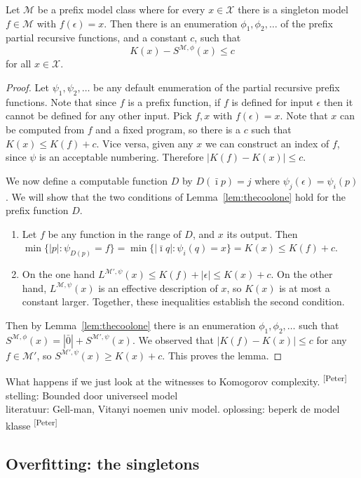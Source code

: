 \documentclass{style/llncs}
\newcommand{\M}{\mathscr M}
\newcommand{\X}{\mathscr X}
\newcommand{\pb}[1]{\textcolor{OliveGreen}{\small #1 \textsuperscript{[Peter]} }}
\begin{document}
\begin{lemma}
Let $\M$ be a prefix model class where for every $x\in\X$ there is a singleton model $f\in\M$ with $f(\epsilon)=x$. Then there is an enumeration $\phi_1,\phi_2,\ldots$ of the prefix partial recursive functions, and a constant $c$, such that
\[
K(x)-S^{\M,\phi}(x)\le c
\]
for all $x\in\X$.
\end{lemma}
\begin{proof}
Let $\psi_1,\psi_2,\ldots$ be any default enumeration of the partial recursive prefix functions. Note that since $f$ is a prefix function, if $f$ is defined for input $\epsilon$ then it cannot be defined for any other input. Pick $f,x$ with $f(\epsilon)=x$. Note that $x$ can be computed from $f$ and a fixed program, so there is a $c$ such that $K(x)\le K(f)+c$. Vice versa, given any $x$ we can construct an index of $f$, since $\psi$ is an acceptable numbering. Therefore $|K(f)-K(x)|\le c$.

We now define a computable function $D$ by $D(\bar\imath p)=j$ where $\psi_j(\epsilon) = \psi_i(p)$.  We will show that the two conditions of Lemma~\ref{lem:thecoolone} hold for the prefix function $D$.

\begin{enumerate}
\item Let $f$ be any function in the range of $D$, and $x$ its output. Then $\min\{|p|:\psi_{D(p)}=f\}=\min\{|\bar\imath q|:\psi_i(q)=x\}=K(x)\le K(f)+c$.
\item On the one hand $L^{\M',\psi}(x)\le K(f)+|\epsilon|\le K(x)+c$. On the other hand, $L^{\M,\psi}(x)$ is an effective description of $x$, so $K(x)$ is at most a constant larger.
Together, these inequalities establish the second condition.
\end{enumerate}

Then by Lemma~\ref{lem:thecoolone} there is an enumeration $\phi_1,\phi_2,\ldots$ such that $S^{\M,\phi}(x)=|\bar 0|+S^{\M',\psi}(x)$. We observed that $|K(f)-K(x)|\le c$ for any $f\in\M'$, so $S^{\M',\psi}(x)\ge K(x)+c$. This proves the lemma.
\end{proof}

\pb{What happens if we just look at the witnesses to Komogorov complexity.}
\pb{
stelling: Bounded door universeel model \\
literatuur: Gell-man, Vitanyi noemen univ model.
oplossing: beperk de model klasse
}

\subsection{Overfitting: the singletons}
\end{document}
